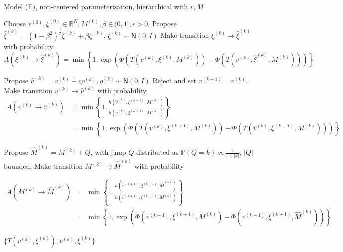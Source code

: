 \documentclass{siamart1116}
\begin{document}
        \begin{algorithm}
            \caption{Model (E), non-centered parameterization, hierarchical with $v, M$}
            \label{alg:hier_v_M}
            \begin{algorithmic}[1]
            \State Choose $v^{(0)}, \xi^{(0)} \in \mathbb{R}^N, M^{(0)}, \beta \in (0, 1], \epsilon > 0$.
            \State Propose $\hat\xi^{(k)} = (1-\beta^2)^{\frac{1}{2}}\xi^{(k)} + \beta \zeta^{(k)}$, $\zeta^{(k)} \sim \mathsf{N}(0, I)$
            \State Make transition $\xi^{(k)} \to \hat\xi^{(k)}$ with probability
            \[ A(\xi^{(k)} \to \hat\xi^{(k)}) = \min\left\{1, \exp\left(\Phi(T(v^{(k)}, \xi^{(k)}, M^{(k)})) - \Phi(T(v^{(k)}, \hat \xi^{(k)}, M^{(k)}))\right) \right\}\]

            \State Propose $\hat v^{(k)} = v^{(k)} + \epsilon \rho^{(k)}, \rho^{(k)} \sim \mathsf{N}(0,I)$
                \State Reject and set $v^{(k+1)} = v^{(k)}$.
            \Else
            \State Make transition $v^{(k)} \to \hat v^{(k)}$ with probability
            \begin{align*}
             A(v^{(k)} \to \hat v^{(k)}) &= \min\left\{1, \frac{h(\hat v^{(k)}, \xi^{(k+1)}, M^{(k)})}{h(v^{(k)}, \xi^{(k+1)}, M^{(k)})}\right\} \\
             &= \min\left\{1, \exp\left(\Phi(T(v^{(k)}, \xi^{(k+1)},M^{(k)}))-\Phi(T(\hat v^{(k)}, \xi^{(k+1)}, M^{(k)})) \right) \right\}
             \end{align*}
            \EndIf

            \State Propose $\hat M^{(k)} = M^{(k)} + Q$, with jump $Q$ distributed as $\mathbb{P}(Q=k) \propto \frac{1}{1+|k|}$, $|Q|$ bounded.
            \State Make transition $M^{(k)} \to \hat M^{(k)}$ with probability

            \begin{align*}
            A(M^{(k)} \to \hat M^{(k)}) &= \min\left\{1, \frac{h( v^{(k+1)}, \xi^{(k+1)}, \hat M^{(k)}  )}{h( v^{(k+1)}, \xi^{(k+1)}, M^{(k)} )} \right\}\\
            &=\min\left\{1, \exp\left(\Phi(v^{(k+1)}, \xi^{(k+1)}, M^{(k)} ) - \Phi(v^{(k+1)}, \xi^{(k+1)}, \hat M^{(k)} )\right)\right\}
            \end{align*}

            \EndFor
            \State \Return $\{ T(v^{(k)},\xi^{(k)}), v^{(k)}, \xi^{(k)} \}$
            \end{algorithmic}
        \end{algorithm}
\end{document}
